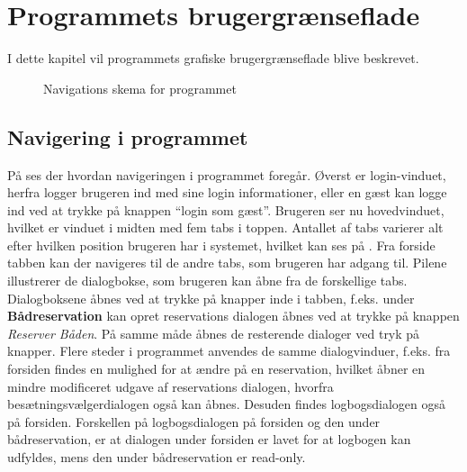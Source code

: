 \chapter{Programmets brugergrænseflade}


I dette kapitel vil programmets grafiske brugergrænseflade blive beskrevet.

\begin{center}
    \begin{figure}[H]
        \caption{Navigations skema for programmet}
        \label{img:programNavigation}
        \vspace{-60pt}
    \end{figure}
\end{center}


\section{Navigering i programmet}
På  ses der hvordan navigeringen i programmet foregår.
Øverst er login-vinduet, herfra logger brugeren ind med sine login informationer, eller en gæst kan logge ind ved at trykke på knappen ``login som gæst''. 
Brugeren ser nu hovedvinduet, hvilket er vinduet i midten med fem tabs i toppen.
Antallet af tabs varierer alt efter hvilken position brugeren har i systemet, hvilket kan ses på . 
Fra forside tabben kan der navigeres til de andre tabs, som brugeren har adgang til.
Pilene illustrerer de dialogbokse, som brugeren kan åbne fra de forskellige tabs.
Dialogboksene åbnes ved at trykke på knapper inde i tabben, f.eks. under  \textbf{Bådreservation} kan opret reservations dialogen åbnes ved at trykke på knappen \textit{Reserver Båden}. 
På samme måde åbnes de resterende dialoger ved tryk på knapper.
Flere steder i programmet anvendes de samme dialogvinduer, f.eks. fra forsiden findes en mulighed for at ændre på en reservation, hvilket åbner en mindre modificeret udgave af reservations dialogen, hvorfra besætningsvælgerdialogen også kan åbnes.
Desuden findes logbogsdialogen også på forsiden.
Forskellen på logbogsdialogen på forsiden og den under bådreservation, er at dialogen under forsiden er lavet for at logbogen kan udfyldes, mens den under bådreservation er read-only. 



